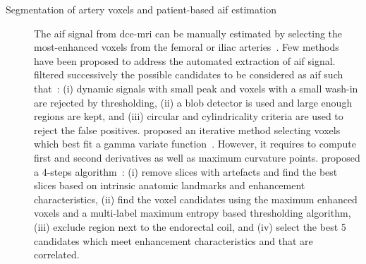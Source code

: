 \begin{description}
  \item[Segmentation of artery voxels and patient-based \ac{aif} estimation] The \ac{aif} signal from \ac{dce}-\ac{mri} can be manually estimated by selecting the most-enhanced voxels from the femoral or iliac arteries~\cite{meng2010comparison}.
    Few methods have been proposed to address the automated extraction of \ac{aif} signal.
    \citeauthor{Chen2008} filtered successively the possible candidates to be considered as \ac{aif} such that~\cite{Chen2008}:
    (i) dynamic signals with small peak and voxels with a small wash-in are rejected by thresholding,
    (ii) a blob detector is used and large enough regions are kept, and
    (iii) circular and cylindricality criteria are used to reject the false positives.
    \citeauthor{zhu2011automated} proposed an iterative method selecting voxels which best fit a gamma variate function~\cite{zhu2011automated}.
    However, it requires to compute first and second derivatives as well as maximum curvature points.
    \citeauthor{shanbhag2012generalized} proposed a 4-steps algorithm~\cite{shanbhag2012generalized,fennessy2015quantitative}:
    (i) remove slices with artefacts and find the best slices based on intrinsic anatomic landmarks and enhancement characteristics,
    (ii) find the voxel candidates using the maximum enhanced voxels and a multi-label maximum entropy based thresholding algorithm,
    (iii) exclude region next to the endorectal coil, and
    (iv) select the best 5 candidates which meet enhancement characteristics and that are correlated.


\end{description}
